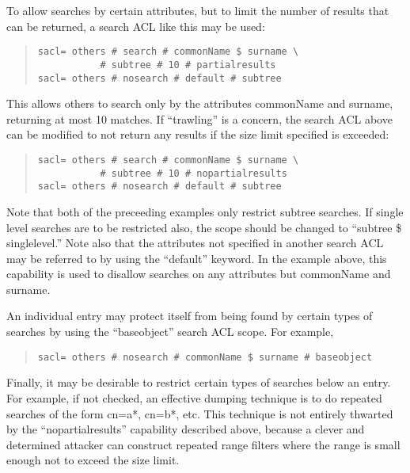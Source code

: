 To allow searches by certain attributes, but to limit the number of
results that can be returned, a search ACL like this may be used:

\begin{quote}\small\begin{verbatim}
sacl= others # search # commonName $ surname \ 
           # subtree # 10 # partialresults
sacl= others # nosearch # default # subtree
\end{verbatim}\end{quote}

This allows others to search only by the attributes commonName and surname,
returning at most 10 matches.  If ``trawling'' is a concern, the search
ACL above can be modified to not return any results if the size limit
specified is exceeded:

\begin{quote}\small\begin{verbatim}
sacl= others # search # commonName $ surname \ 
           # subtree # 10 # nopartialresults
sacl= others # nosearch # default # subtree
\end{verbatim}\end{quote}

Note that both of the preceeding examples only restrict subtree searches.
If single level searches are to be restricted also, the scope should be
changed to ``subtree \$ singlelevel.''  Note also that the attributes not
specified in another search ACL may be referred to by using the ``default''
keyword.  In the example above, this capability is used to disallow
searches on any attributes but commonName and surname.

An individual entry may protect itself from being found by certain types
of searches by using the ``baseobject'' search ACL scope.  For example,

\begin{quote}\small\begin{verbatim}
sacl= others # nosearch # commonName $ surname # baseobject
\end{verbatim}\end{quote}

Finally, it may be desirable to restrict certain types of searches below
an entry.  For example, if not checked, an effective dumping technique is
to do repeated searches of the form cn=a*, cn=b*, etc.  This technique is
not entirely thwarted by the ``nopartialresults'' capability
described above, because a clever and determined attacker can construct
repeated range filters where the range is small enough not to
exceed the size limit.


